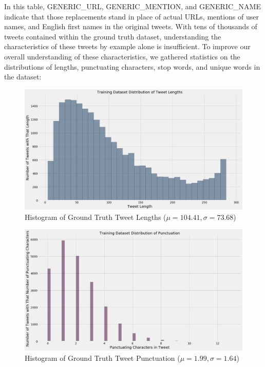 \documentclass[11pt, twoside, reqno]{book}
\begin{document}
In this table, GENERIC\_URL, GENERIC\_MENTION, and GENERIC\_NAME indicate that those replacements stand in place of actual URLs, mentions of user names, and English first names in the original tweets. With tens of thousands of tweets contained within the ground truth dataset, understanding the characteristics of these tweets by example alone is insufficient. To improve our overall understanding of these characteristics, we gathered statistics on the distributions of lengths, punctuating characters, stop words, and unique words in the dataset:

\begin{figure}[H]
	\centering
	\includegraphics[width=\textwidth]{length_histogram}
	\caption{Histogram of Ground Truth Tweet Lengths ($\mu=104.41, \sigma=73.68$)}
	\label{fig:tweet_lengths}
\end{figure}

\begin{figure}[H]
	\centering
	\includegraphics[width=\textwidth]{punctuation_histogram}
	\caption{Histogram of Ground Truth Tweet Punctuation ($\mu=1.99, \sigma=1.64$)}
	\label{fig:tweet_puncutation}
\end{figure}
\end{document}
